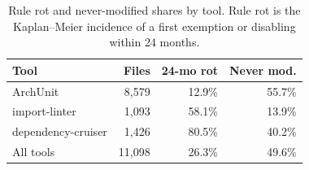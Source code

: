 \begin{table}[t]
\centering
\caption{Rule rot and never-modified shares by tool. Rule rot is the Kaplan--Meier incidence of a first exemption or disabling within 24 months.}
\label{tab:rule_rot_by_tool}
\small
\setlength{\tabcolsep}{7pt}
\renewcommand{\arraystretch}{1.25}
\begin{tabular}{lrrr}
\toprule
\textbf{Tool} & \textbf{Files} & \textbf{24-mo rot} & \textbf{Never mod.} \\
\midrule
\rowcolor{rowband}
ArchUnit & 8{,}579 & 12.9\% & 55.7\% \\
import-linter & 1{,}093 & 58.1\% & 13.9\% \\
\rowcolor{rowband}
dependency-cruiser & 1{,}426 & 80.5\% & 40.2\% \\
\midrule
All tools & 11{,}098 & 26.3\% & 49.6\% \\
\bottomrule
\end{tabular}
\end{table}